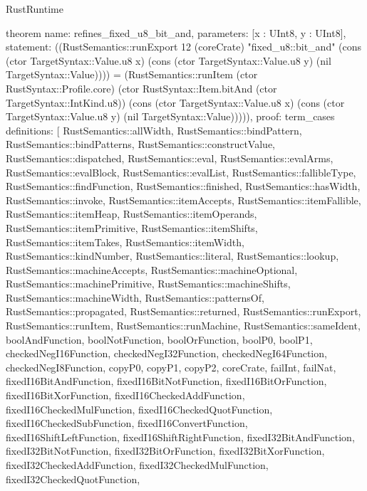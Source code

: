 \begin{lexlean}{RustRuntime}
\begin{semanticmodule}
theorem{
  name: refines_fixed_u8_bit_and,
  parameters: [x : UInt8, y : UInt8],
  statement: ((RustSemantics::runExport 12 (coreCrate) "fixed_u8::bit_and" (cons (ctor TargetSyntax::Value.u8 x) (cons (ctor TargetSyntax::Value.u8 y) (nil TargetSyntax::Value)))) = (RustSemantics::runItem (ctor RustSyntax::Profile.core) (ctor RustSyntax::Item.bitAnd (ctor TargetSyntax::IntKind.u8)) (cons (ctor TargetSyntax::Value.u8 x) (cons (ctor TargetSyntax::Value.u8 y) (nil TargetSyntax::Value))))),
  proof: term_cases{
    definitions: [
      RustSemantics::allWidth,
      RustSemantics::bindPattern,
      RustSemantics::bindPatterns,
      RustSemantics::constructValue,
      RustSemantics::dispatched,
      RustSemantics::eval,
      RustSemantics::evalArms,
      RustSemantics::evalBlock,
      RustSemantics::evalList,
      RustSemantics::fallibleType,
      RustSemantics::findFunction,
      RustSemantics::finished,
      RustSemantics::hasWidth,
      RustSemantics::invoke,
      RustSemantics::itemAccepts,
      RustSemantics::itemFallible,
      RustSemantics::itemHeap,
      RustSemantics::itemOperands,
      RustSemantics::itemPrimitive,
      RustSemantics::itemShifts,
      RustSemantics::itemTakes,
      RustSemantics::itemWidth,
      RustSemantics::kindNumber,
      RustSemantics::literal,
      RustSemantics::lookup,
      RustSemantics::machineAccepts,
      RustSemantics::machineOptional,
      RustSemantics::machinePrimitive,
      RustSemantics::machineShifts,
      RustSemantics::machineWidth,
      RustSemantics::patternsOf,
      RustSemantics::propagated,
      RustSemantics::returned,
      RustSemantics::runExport,
      RustSemantics::runItem,
      RustSemantics::runMachine,
      RustSemantics::sameIdent,
      boolAndFunction,
      boolNotFunction,
      boolOrFunction,
      boolP0,
      boolP1,
      checkedNegI16Function,
      checkedNegI32Function,
      checkedNegI64Function,
      checkedNegI8Function,
      copyP0,
      copyP1,
      copyP2,
      coreCrate,
      failInt,
      failNat,
      fixedI16BitAndFunction,
      fixedI16BitNotFunction,
      fixedI16BitOrFunction,
      fixedI16BitXorFunction,
      fixedI16CheckedAddFunction,
      fixedI16CheckedMulFunction,
      fixedI16CheckedQuotFunction,
      fixedI16CheckedSubFunction,
      fixedI16ConvertFunction,
      fixedI16ShiftLeftFunction,
      fixedI16ShiftRightFunction,
      fixedI32BitAndFunction,
      fixedI32BitNotFunction,
      fixedI32BitOrFunction,
      fixedI32BitXorFunction,
      fixedI32CheckedAddFunction,
      fixedI32CheckedMulFunction,
      fixedI32CheckedQuotFunction,
}}
\end{semanticmodule}
\end{lexlean}
